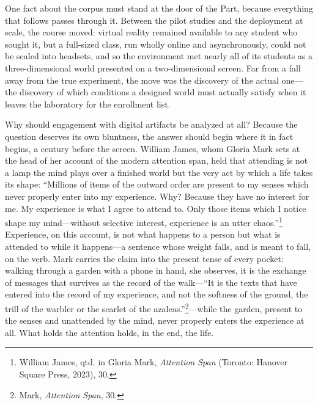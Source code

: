 \documentclass{article}
\begin{document}
One fact about the corpus must stand at the door of the Part, because everything that follows passes through it. Between the pilot studies and the deployment at scale, the course moved: virtual reality remained available to any student who sought it, but a full-sized class, run wholly online and asynchronously, could not be scaled into headsets, and so the environment met nearly all of its students as a three-dimensional world presented on a two-dimensional screen. Far from a fall away from the true experiment, the move was the discovery of the actual one---the discovery of which conditions a designed world must actually satisfy when it leaves the laboratory for the enrollment list.

Why should engagement with digital artifacts be analyzed at all? Because the question deserves its own bluntness, the answer should begin where it in fact begins, a century before the screen. William James, whom Gloria Mark sets at the head of her account of the modern attention span, held that attending is not a lamp the mind plays over a finished world but the very act by which a life takes its shape: ``Millions of items of the outward order are present to my senses which never properly enter into my experience. Why? Because they have no interest for me. My experience is what I agree to attend to. Only those items which I notice shape my mind---without selective interest, experience is an utter chaos.''\footnote{William James, qtd. in Gloria Mark, \textit{Attention Span} (Toronto: Hanover Square Press, 2023), 30.} Experience, on this account, is not what happens to a person but what is attended to while it happens---a sentence whose weight falls, and is meant to fall, on the verb. Mark carries the claim into the present tense of every pocket: walking through a garden with a phone in hand, she observes, it is the exchange of messages that survives as the record of the walk---``It is the texts that have entered into the record of my experience, and not the softness of the ground, the trill of the warbler or the scarlet of the azaleas.''\footnote{Mark, \textit{Attention Span}, 30.}---while the garden, present to the senses and unattended by the mind, never properly enters the experience at all. What holds the attention holds, in the end, the life.
\end{document}
